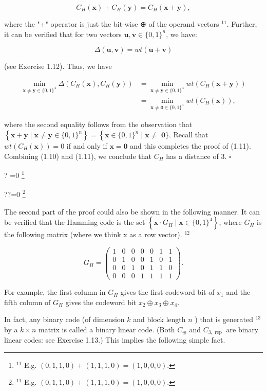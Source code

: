 \documentclass[10pt]{article}
\let\svthefootnote\thefootnote
\newcommand\blfootnotetext[1]{%
  \let\thefootnote\relax\footnote{#1}%
  \addtocounter{footnote}{-1}%
  \let\thefootnote\svthefootnote%
}
\let\svfootnotetext\footnotetext
\renewcommand\footnotetext[2][?]{%
  \if\relax#1\relax%
    \ifnum\value{footnote}=0\blfootnotetext{#2}\else\svfootnotetext{#2}\fi%
  \else%
    \if?#1\ifnum\value{footnote}=0\blfootnotetext{#2}\else\svfootnotetext{#2}\fi%
    \else\svfootnotetext[#1]{#2}\fi%
  \fi
}
\begin{document}
$$
C_{H}(\mathbf{x})+C_{H}(\mathbf{y})=C_{H}(\mathbf{x}+\mathbf{y}),
$$

where the "+" operator is just the bit-wise ⊕ of the operand vectors ${ }^{11}$. Further, it can be verified that for two vectors $\mathbf{u}, \mathbf{v} \in\{0,1\}^{n}$, we have:

$$
\Delta(\mathbf{u}, \mathbf{v})=w t(\mathbf{u}+\mathbf{v})
$$

(see Exercise 1.12). Thus, we have

$$
\begin{aligned}
\min _{\mathbf{x} \neq \mathbf{y} \in\{0,1\}^{4}} \Delta\left(C_{H}(\mathbf{x}), C_{H}(\mathbf{y})\right) & =\min _{\mathbf{x} \neq \mathbf{y} \in\{0,1\}^{4}} w t\left(C_{H}(\mathbf{x}+\mathbf{y})\right) \\
& =\min _{\mathbf{x} \neq \mathbf{0} \in\{0,1\}^{4}} w t\left(C_{H}(\mathbf{x})\right),
\end{aligned}
$$

where the second equality follows from the observation that $\left\{\mathbf{x}+\mathbf{y} \mid \mathbf{x} \neq \mathbf{y} \in\{0,1\}^{n}\right\}=\left\{\mathbf{x} \in\{0,1\}^{n} \mid \mathbf{x} \neq\right.$ $\mathbf{0}\}$. Recall that $w t\left(C_{H}(\mathbf{x})\right)=0$ if and only if $\mathbf{x}=\mathbf{0}$ and this completes the proof of (1.11). Combining (1.10) and (1.11), we conclude that $C_{H}$ has a distance of 3. \(\square\)

The second part of the proof could also be shown in the following manner. It can be verified that the Hamming code is the set $\left\{\mathbf{x} \cdot G_{H} \mid \mathbf{x} \in\{0,1\}^{4}\right\}$, where $G_{H}$ is the following matrix (where we think x as a row vector). ${ }^{12}$

$$
G_{H}=\left(\begin{array}{lllllll}
1 & 0 & 0 & 0 & 0 & 1 & 1 \\
0 & 1 & 0 & 0 & 1 & 0 & 1 \\
0 & 0 & 1 & 0 & 1 & 1 & 0 \\
0 & 0 & 0 & 1 & 1 & 1 & 1
\end{array}\right) .
$$

For example, the first column in $G_{H}$ gives the first codeword bit of $x_{1}$ and the fifth column of $G_{H}$ gives the codeword bit $x_{2} \oplus x_{3} \oplus x_{4}$.

In fact, any binary code (of dimension $k$ and block length $n$ ) that is generated ${ }^{13}$ by a $k \times n$ matrix is called a binary linear code. (Both $C_{\oplus}$ and $C_{3, \text { rep }}$ are binary linear codes: see Exercise 1.13.) This implies the following simple fact.
\end{document}
